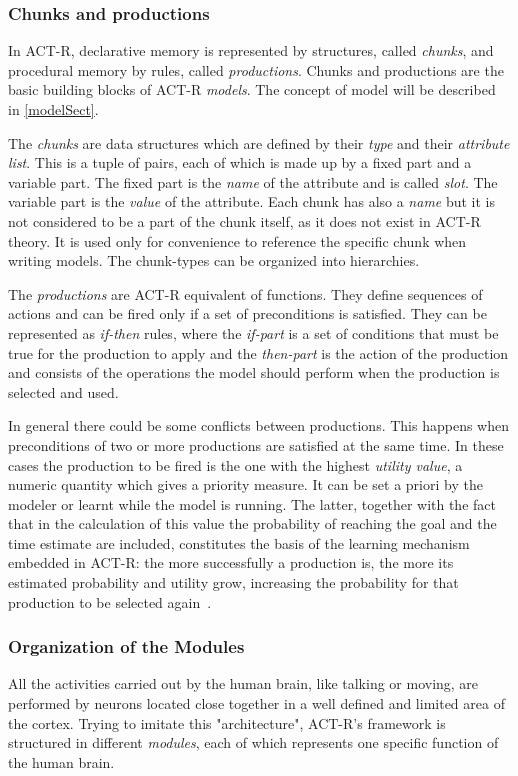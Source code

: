 		\subsubsection{Chunks and productions}
		In \mbox{ACT-R}, declarative memory is represented by structures, called \emph{chunks}, and procedural memory  by rules, called \emph{productions}. Chunks and productions are the basic building blocks of ACT-R \emph{models}. The concept of model will be described in \ref{modelSect}.
	
		The \emph{chunks} are data structures which are defined by their \emph{type} and their \emph{attribute list}. This is a tuple of pairs, each of which is made up by a fixed part and a variable part.
		The fixed part is the \emph{name} of the attribute and is called \emph{slot}.
		The variable part is the \emph{value} of the attribute.
		Each chunk has also a \emph{name} but it is not considered to be a part of the chunk itself, as it does not exist in \mbox{ACT-R} theory. It is used only for convenience to reference the specific chunk when writing models. The chunk-types can be organized into hierarchies.
	
		The \emph{productions} are \mbox{ACT-R} equivalent of functions. They define sequences of actions and can be fired only if a set of preconditions is satisfied. They can be represented as \emph{if-then} rules, where the \emph{if-part} is a set of conditions that must be true for the production to apply and the \emph{then-part} is the action of the production and consists of the operations the model should perform when the production is selected and used. 

		In general there could be some conflicts between productions. This happens when preconditions of two or more productions are satisfied at the same time. In these cases the production to be fired is the one with the highest \emph{utility value}, a numeric quantity which gives a priority measure. It can be set a priori by the modeler or learnt while the model is running. The latter, together with the fact that in the calculation of this value the probability of reaching the goal and the time estimate are included, constitutes the basis of the learning mechanism embedded in \mbox{ACT-R}: the more successfully a production is, the more its estimated probability and utility grow, increasing the probability for that production to be selected again~\cite{actr6refman}.
	

		\subsubsection{Organization of the Modules}
		All the activities carried out by the human brain, like talking or moving, are performed by neurons located close together in a well defined and limited area of the cortex. Trying to imitate this "architecture", \mbox{ACT-R's} framework is structured in different \emph{modules}, each of which represents one specific function of the human brain. 
	
